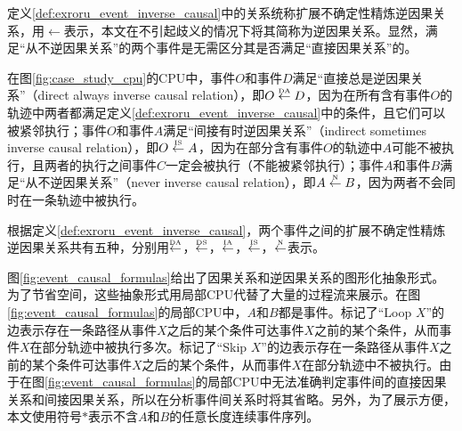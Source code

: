 定义\ref{def:exroru_event_inverse_causal}中的关系统称扩展不确定性精炼逆因果关系，用$\leftarrow$表示，本文在不引起歧义的情况下将其简称为逆因果关系。显然，满足“从不逆因果关系”的两个事件是无需区分其是否满足“直接因果关系”的。

\begin{example}\label{ex:exroru_event_inverse_causal}
在图\ref{fig:case_study_cpu}的CPU中，事件$O$和事件$D$满足“直接总是逆因果关系”（direct always inverse causal relation），即$O\overset{\text{\tiny{DA}}}{\leftarrow}D$，因为在所有含有事件$O$的轨迹中两者都满足定义\ref{def:exroru_event_inverse_causal}中的条件，且它们可以被紧邻执行；事件$O$和事件$A$满足“间接有时逆因果关系”（indirect sometimes inverse causal relation），即$O\overset{\text{\tiny{IS}}}{\leftarrow}A$，因为在部分含有事件$O$的轨迹中$A$可能不被执行，且两者的执行之间事件$C$一定会被执行（不能被紧邻执行）；事件$A$和事件$B$满足“从不逆因果关系”（never inverse causal relation），即$A\overset{\text{\tiny{N}}}{\leftarrow}B$，因为两者不会同时在一条轨迹中被执行。
\end{example}

根据定义\ref{def:exroru_event_inverse_causal}，两个事件之间的扩展不确定性精炼逆因果关系共有五种，分别用$\overset{\text{\tiny{DA}}}{\leftarrow}$，$\overset{\text{\tiny{DS}}}{\leftarrow}$，$\overset{\text{\tiny{IA}}}{\leftarrow}$，$\overset{\text{\tiny{IS}}}{\leftarrow}$，$\overset{\text{\tiny{N}}}{\leftarrow}$表示。

图\ref{fig:event_causal_formulas}给出了因果关系和逆因果关系的图形化抽象形式。为了节省空间，这些抽象形式用局部CPU代替了大量的过程流来展示。在图\ref{fig:event_causal_formulas}的局部CPU中，$A$和$B$都是事件。标记了“Loop $X$”的边表示存在一条路径从事件$X$之后的某个条件可达事件$X$之前的某个条件，从而事件$X$在部分轨迹中被执行多次。标记了“Skip $X$”的边表示存在一条路径从事件$X$之前的某个条件可达事件$X$之后的某个条件，从而事件$X$在部分轨迹中不被执行。由于在图\ref{fig:event_causal_formulas}的局部CPU中无法准确判定事件间的直接因果关系和间接因果关系，所以在分析事件间关系时将其省略。另外，为了展示方便，本文使用符号$*$表示不含$A$和$B$的任意长度连续事件序列。

